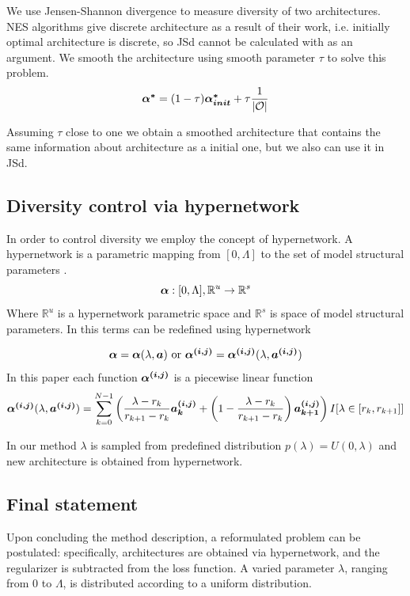 \documentclass{article}
\begin{document}
We use Jensen-Shannon divergence to measure diversity of two architectures. NES algorithms give discrete architecture as a result of their work, i.e. initially optimal architecture \mbox{} is discrete, so JSd cannot be calculated with \mbox{} as an argument. We smooth the architecture using smooth parameter $\tau$ to solve this problem. 
$$
\mbox{\boldmath{$\alpha^*$}} = (1 - \tau)\mbox{\boldmath{$\alpha_{init}^*$}} + \tau \frac{1}{|\mathcal{O}|}
$$

Assuming $\tau$ close to one we obtain a smoothed architecture that contains the same information about architecture as a initial one, but we also can use it in JSd.

\subsection{Diversity control via hypernetwork}

In order to control diversity we employ the concept of hypernetwork. A hypernetwork is a parametric mapping from $[0, \Lambda]$ to the set of model structural parameters \citep{darts-cc}.
$$
\mbox{\boldmath{$\alpha$}} : [0, \Lambda], \mathbb{R}^u \to \mathbb{R}^s
$$
Where $\mathbb{R}^u$ is a hypernetwork parametric space and $\mathbb{R}^s$ is space of model structural parameters. In this terms \mbox{\boldmath{$\alpha$}} can be redefined using hypernetwork

$$
\mbox{\boldmath{$\alpha$}} = \mbox{\boldmath{$\alpha$}}(\lambda, \mbox{\boldmath{$a$}}) \text{ or } \mbox{\boldmath{$\alpha^{(i, j)}$}} = \mbox{\boldmath{$\alpha^{(i, j)}$}}(\lambda, \mbox{\boldmath{$a^{(i, j)}$}})
$$
In this paper each function $\mbox{\boldmath{$\alpha^{(i, j)}$}}$ is a piecewise linear function
$$
\mbox{\boldmath{$\alpha^{(i, j)}$}}(\lambda, \mbox{\boldmath{$a^{(i, j)}$}}) = \sum_{k=0}^{N-1} \left( \frac{\lambda - r_k}{r_{k + 1} - r_k} \mbox{\boldmath{$a_k^{(i, j)}$}} + \left(1 - \frac{\lambda - r_k}{r_{k + 1} - r_k}\right) \mbox{\boldmath{$a_{k + 1}^{(i, j)}$}} \right) I[\lambda \in [r_k, r_{k+1}]]
$$

In our method $\lambda$ is sampled from predefined distribution $p(\lambda) = U(0, \lambda)$ and new architecture is obtained from hypernetwork.

\subsection{Final statement}

Upon concluding the method description, a reformulated problem can be postulated: specifically, architectures are obtained via hypernetwork, and the regularizer is subtracted from the loss function. A varied parameter $\lambda$, ranging from 0 to $\Lambda$, is distributed according to a uniform distribution.
\end{document}
